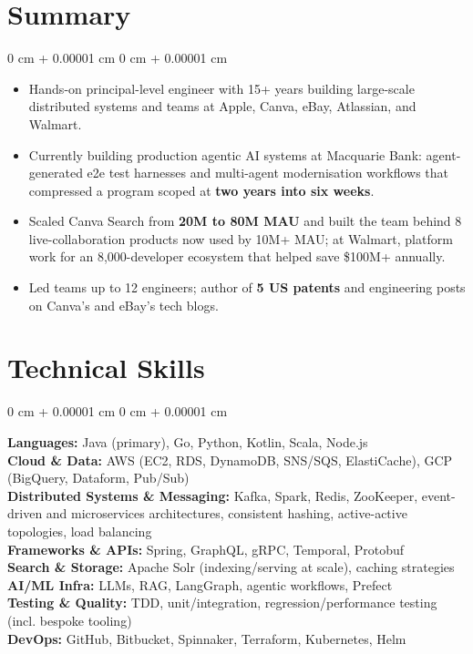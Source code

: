 \documentclass[10pt, letterpaper]{article}
\newenvironment{highlights}{
    \begin{itemize}[
        topsep=0.10 cm,
        parsep=0.10 cm,
        partopsep=0pt,
        itemsep=0pt,
        leftmargin=0 cm + 10pt
    ]
}{
    \end{itemize}
} %
\newenvironment{onecolentry}{
    \begin{adjustwidth}{
        0 cm + 0.00001 cm
    }{
        0 cm + 0.00001 cm
    }
}{
    \end{adjustwidth}
} %
\begin{document}
    \section{Summary}
    \begin{onecolentry}
        \begin{highlights}
            \item Hands-on principal-level engineer with 15+ years building large-scale distributed systems and teams at Apple, Canva, eBay, Atlassian, and Walmart.

            \item Currently building production agentic AI systems at Macquarie Bank: agent-generated e2e test harnesses and multi-agent modernisation workflows that compressed a program scoped at \textbf{two years into six weeks}.

            \item Scaled Canva Search from \textbf{20M to 80M MAU} and built the team behind 8 live-collaboration products now used by 10M+ MAU; at Walmart, platform work for an 8,000-developer ecosystem that helped save \$100M+ annually.

            \item Led teams up to 12 engineers; author of \textbf{5 US patents} and engineering posts on Canva's and eBay's tech blogs.
        \end{highlights}
    \end{onecolentry}

    \section{Technical Skills}
        \begin{onecolentry}
            \textbf{Languages:} Java (primary), Go, Python, Kotlin, Scala, Node.js \\
            \textbf{Cloud \& Data:} AWS (EC2, RDS, DynamoDB, SNS/SQS, ElastiCache), GCP (BigQuery, Dataform, Pub/Sub) \\
            \textbf{Distributed Systems \& Messaging:} Kafka, Spark, Redis, ZooKeeper, event-driven and microservices architectures, consistent hashing, active-active topologies, load balancing \\
            \textbf{Frameworks \& APIs:} Spring, GraphQL, gRPC, Temporal, Protobuf \\
            \textbf{Search \& Storage:} Apache Solr (indexing/serving at scale), caching strategies \\
            \textbf{AI/ML Infra:} LLMs, RAG, LangGraph, agentic workflows, Prefect \\
            \textbf{Testing \& Quality:} TDD, unit/integration, regression/performance testing (incl. bespoke tooling) \\
            \textbf{DevOps:} GitHub, Bitbucket, Spinnaker, Terraform, Kubernetes, Helm \\
        \end{onecolentry}
\end{document}
